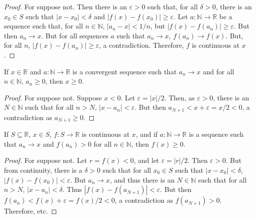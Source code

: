             \begin{proof}
                For suppose not. Then there is an
                $\varepsilon>0$ such that, for all $\delta>0$,
                there is an $x_{0}\in{S}$ such that
                $|x-x_{0}|<\delta$ and
                $|f(x)-f(x_{0})|\geq\varepsilon$.
                Let $a:\mathbb{N}\rightarrow\mathbb{R}$
                be a sequence such that, for all
                $n\in\mathbb{N}$, $|a_{n}-x|<1/n$, but
                $|f(x)-f(a_{n})|\geq\varepsilon$.
                But then $a_{n}\rightarrow{x}$. But for all
                sequences $a$ such that $a_{n}\rightarrow{x}$,
                $f(a_{n})\rightarrow{f(x)}$. But, for all $n$,
                $|f(x)-f(a_{n})|\geq\varepsilon$,
                a contradiction.
                Therefore, $f$ is continuous at $x$.
            \end{proof}
            \begin{theorem}
                If $x\in\mathbb{R}$ and
                $a:\mathbb{N}\rightarrow\mathbb{R}$
                is a convergent sequence such that
                $a_{n}\rightarrow{x}$ and for all
                $n\in\mathbb{N}$, $a_{n}\geq{0}$,
                then $x\geq{0}$.
            \end{theorem}
            \begin{proof}
                For suppose not. Suppose $x<0$. Let
                $\varepsilon=|x|/2$. Then, as $\varepsilon>0$, there
                is an $N\in\mathbb{N}$ such that for all $n>N$,
                $|x-a_{n}|<\varepsilon$. But then
                $a_{N+1}<x+\varepsilon=x/2<0$, a contradiction as
                $a_{N+1}\geq{0}$.
            \end{proof}
            \begin{theorem}
                \label{thm:Funct:Continuous_Limit_%
                       of_Pos_Sequ_is_nonneg}
                If $S\subseteq\mathbb{R}$, $x\in{S}$,
                $f:S\rightarrow\mathbb{R}$ is continuous at $x$, and if
                $a:\mathbb{N}\rightarrow\mathbb{R}$ is a sequence such
                that  $a_{n}\rightarrow{x}$ and $f(a_{n})>0$
                for all $n\in\mathbb{N}$, then $f(x)\geq{0}$.
            \end{theorem}
            \begin{proof}
                For suppose not. Let $r=f(x)<0$, and let
                $\varepsilon=|r|/2$. Then $\varepsilon>0$. But
                from continuity, there is a $\delta>0$ such that
                for all $x_{0}\in{S}$ such that $|x-x_{0}|<\delta$,
                $|f(x)-f(x_{0})|<\varepsilon$. But
                $a_{n}\rightarrow{x}$, and thus there is an
                $N\in\mathbb{N}$ such that for all $n>N$,
                $|x-a_{n}|<\delta$. Thus
                $|f(x)-f(a_{N+1})|<\varepsilon$. But then
                $f(a_{n})<f(x)+\varepsilon=f(x)/2<0$,
                a contradiction as $f(a_{N+1})>0$. Therefore, etc.
            \end{proof}
